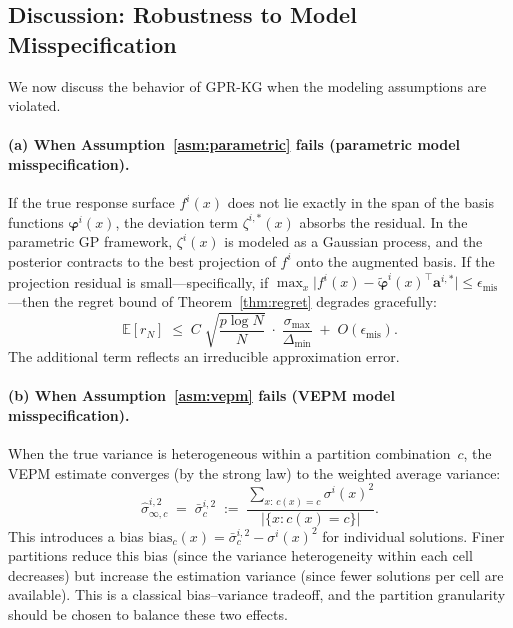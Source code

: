 \documentclass[12pt]{article}
\theoremstyle{plain}
\theoremstyle{definition}
\theoremstyle{remark}
\begin{document}
\subsection{Discussion: Robustness to Model Misspecification}%
\label{sec:robustness}

We now discuss the behavior of GPR-KG when the modeling assumptions are
violated.

\paragraph{(a) When Assumption~\ref{asm:parametric} fails (parametric
model misspecification).}
If the true response surface $f^{i}(x)$ does not lie exactly in the span
of the basis functions $\boldsymbol{\varphi}^{i}(x)$, the deviation term
$\zeta^{i,*}(x)$ absorbs the residual.  In the parametric GP framework,
$\zeta^{i}(x)$ is modeled as a Gaussian process, and the posterior
contracts to the best projection of $f^{i}$ onto the augmented basis.  If
the projection residual is small---specifically, if
$\max_{x}\lvert f^{i}(x)
  -\tilde{\boldsymbol{\varphi}}^{i}(x)^{\!\top}\mathbf{a}^{i,*}\rvert
  \le\epsilon_{\mathrm{mis}}$---then the regret bound of
Theorem~\ref{thm:regret} degrades gracefully:
\[
  \mathbb{E}[r_{N}]
  \;\le\;
  C\;\sqrt{\frac{p\log N}{N}}\;\cdot\;
  \frac{\sigma_{\max}}{\Delta_{\min}}
  \;+\;
  O(\epsilon_{\mathrm{mis}}).
\]
The additional term reflects an irreducible approximation error.

\paragraph{(b) When Assumption~\ref{asm:vepm} fails (VEPM model
misspecification).}
When the true variance is heterogeneous within a partition combination~$c$,
the VEPM estimate converges (by the strong law) to the weighted average
variance:
\[
  \hat{\sigma}_{\infty,c}^{i,2}
  \;=\; \bar{\sigma}_{c}^{i,2}
  \;:=\;
  \frac{\sum_{x:\,c(x)=c} \sigma^{i}(x)^{2}}
       {\lvert\{x:c(x)=c\}\rvert}.
\]
This introduces a bias
$\mathrm{bias}_{c}(x)
  = \bar{\sigma}_{c}^{i,2}-\sigma^{i}(x)^{2}$
for individual solutions.  Finer partitions reduce this bias (since the
variance heterogeneity within each cell decreases) but increase the
estimation variance (since fewer solutions per cell are available).  This
is a classical bias--variance tradeoff, and the partition granularity
should be chosen to balance these two effects.
\end{document}

